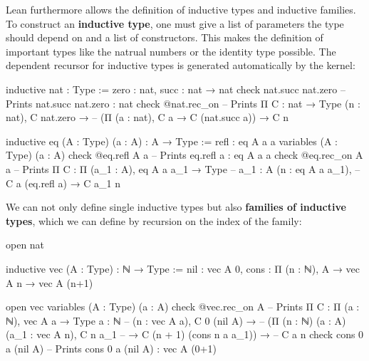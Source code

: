 Lean furthermore allows the definition of inductive types and inductive
families.
To construct an \textbf{inductive type}, one must give a list of parameters the type should
depend on and a list of constructors.
This makes the definition of important types like the natrual numbers or the identity
type possible.
The dependent recursor for inductive types is generated automatically by the kernel:
\begin{leancode}
inductive nat : Type :=
  zero : nat,
  succ : nat → nat
check nat.succ nat.zero -- Prints nat.succ nat.zero : nat
check @nat.rec_on -- Prints Π {C : nat → Type} (n : nat), C nat.zero →
                  --        (Π (a : nat), C a → C (nat.succ a)) → C n
\end{leancode}

\begin{leancode}
inductive eq (A : Type) (a : A) : A → Type :=
  refl : eq A a a
variables (A : Type) (a : A)
check @eq.refl A a -- Prints eq.refl a : eq A a a
check @eq.rec_on A a -- Prints Π {C : Π (a_1 : A), eq A a a_1 → Type}
                     --        {a_1 : A} (n : eq A a a_1),
                     --        C a (eq.refl a) → C a_1 n
\end{leancode}

We can not only define single inductive types but also \textbf{families of
inductive types}, which we can define by recursion on the index of the family:
\begin{leancode}
open nat

inductive vec (A : Type) : ℕ → Type :=
  nil : vec A 0,
  cons : Π (n : ℕ), A → vec A n → vec A (n+1)

open vec
variables (A : Type) (a : A)
check @vec.rec_on A -- Prints Π {C : Π (a : ℕ), vec A a → Type} {a : ℕ} 
                    --        (n : vec A a), C 0 (nil A) →
                    --        (Π (n : ℕ) (a : A) (a_1 : vec A n), C n a_1
                    --          → C (n + 1) (cons n a a_1)) →
                    --        C a n
check cons 0 a (nil A) -- Prints cons 0 a (nil A) : vec A (0+1)
\end{leancode}

